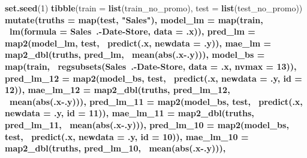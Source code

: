 \documentclass[]{article}
\newenvironment{Shaded}{\begin{snugshade}}{\end{snugshade}}
\newcommand{\DataTypeTok}[1]{\textcolor[rgb]{0.13,0.29,0.53}{#1}}
\newcommand{\DecValTok}[1]{\textcolor[rgb]{0.00,0.00,0.81}{#1}}
\newcommand{\KeywordTok}[1]{\textcolor[rgb]{0.13,0.29,0.53}{\textbf{#1}}}
\newcommand{\NormalTok}[1]{#1}
\newcommand{\OperatorTok}[1]{\textcolor[rgb]{0.81,0.36,0.00}{\textbf{#1}}}
\newcommand{\StringTok}[1]{\textcolor[rgb]{0.31,0.60,0.02}{#1}}
\begin{document}
\begin{Shaded}
\begin{Highlighting}[]
\KeywordTok{set.seed}\NormalTok{(}\DecValTok{1}\NormalTok{)}
\KeywordTok{tibble}\NormalTok{(}\DataTypeTok{train =} \KeywordTok{list}\NormalTok{(train_no_promo), }\DataTypeTok{test =} \KeywordTok{list}\NormalTok{(test_no_promo)) }\OperatorTok{%>%}\StringTok{ }
\StringTok{  }\KeywordTok{mutate}\NormalTok{(}\DataTypeTok{truths =} \KeywordTok{map}\NormalTok{(test, }\StringTok{"Sales"}\NormalTok{),}
         \DataTypeTok{model_lm =} \KeywordTok{map}\NormalTok{(train, }\OperatorTok{~}\KeywordTok{lm}\NormalTok{(}\DataTypeTok{formula =}\NormalTok{ Sales}\OperatorTok{~}\NormalTok{.}\OperatorTok{-}\NormalTok{Date}\OperatorTok{-}\NormalTok{Store, }\DataTypeTok{data =}\NormalTok{ .x)),}
         \DataTypeTok{pred_lm =} \KeywordTok{map2}\NormalTok{(model_lm, test, }\OperatorTok{~}\KeywordTok{predict}\NormalTok{(.x, }\DataTypeTok{newdata =}\NormalTok{ .y)),}
         \DataTypeTok{mae_lm =} \KeywordTok{map2_dbl}\NormalTok{(truths, pred_lm, }\OperatorTok{~}\KeywordTok{mean}\NormalTok{(}\KeywordTok{abs}\NormalTok{(.x}\OperatorTok{-}\NormalTok{.y))),}
         \DataTypeTok{model_bs =} \KeywordTok{map}\NormalTok{(train, }\OperatorTok{~}\KeywordTok{regsubsets}\NormalTok{(Sales}\OperatorTok{~}\NormalTok{.}\OperatorTok{-}\NormalTok{Date}\OperatorTok{-}\NormalTok{Store, }\DataTypeTok{data =}\NormalTok{ .x, }\DataTypeTok{nvmax =} \DecValTok{13}\NormalTok{)),}
         \DataTypeTok{pred_lm_12 =} \KeywordTok{map2}\NormalTok{(model_bs, test, }\OperatorTok{~}\KeywordTok{predict}\NormalTok{(.x, }\DataTypeTok{newdata =}\NormalTok{ .y, }\DataTypeTok{id =} \DecValTok{12}\NormalTok{)),}
         \DataTypeTok{mae_lm_12 =} \KeywordTok{map2_dbl}\NormalTok{(truths, pred_lm_}\DecValTok{12}\NormalTok{, }\OperatorTok{~}\KeywordTok{mean}\NormalTok{(}\KeywordTok{abs}\NormalTok{(.x}\OperatorTok{-}\NormalTok{.y))),}
         \DataTypeTok{pred_lm_11 =} \KeywordTok{map2}\NormalTok{(model_bs, test, }\OperatorTok{~}\KeywordTok{predict}\NormalTok{(.x, }\DataTypeTok{newdata =}\NormalTok{ .y, }\DataTypeTok{id =} \DecValTok{11}\NormalTok{)),}
         \DataTypeTok{mae_lm_11 =} \KeywordTok{map2_dbl}\NormalTok{(truths, pred_lm_}\DecValTok{11}\NormalTok{, }\OperatorTok{~}\KeywordTok{mean}\NormalTok{(}\KeywordTok{abs}\NormalTok{(.x}\OperatorTok{-}\NormalTok{.y))),}
         \DataTypeTok{pred_lm_10 =} \KeywordTok{map2}\NormalTok{(model_bs, test, }\OperatorTok{~}\KeywordTok{predict}\NormalTok{(.x, }\DataTypeTok{newdata =}\NormalTok{ .y, }\DataTypeTok{id =} \DecValTok{10}\NormalTok{)),}
         \DataTypeTok{mae_lm_10 =} \KeywordTok{map2_dbl}\NormalTok{(truths, pred_lm_}\DecValTok{10}\NormalTok{, }\OperatorTok{~}\KeywordTok{mean}\NormalTok{(}\KeywordTok{abs}\NormalTok{(.x}\OperatorTok{-}\NormalTok{.y))),}
}
\end{Highlighting}
\end{Shaded}
\end{document}
